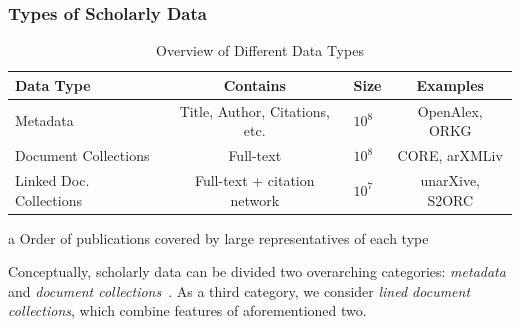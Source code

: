 \subsubsection{Types of Scholarly Data}

\begin{table}[tb]
  \caption{Overview of Different Data Types}
  \label{tab:data_types}
  \centering
  \begin{small}
    \begin{threeparttable}
      \begin{tabular}{lclc}
        \toprule
        Data Type                  & Contains                             & Size\tnote{a} & Examples \\
        \midrule
        Metadata                   & Title, Author, Citations, etc.       & \(10^8\)              & OpenAlex, ORKG \\
        Document Collections       & Full-text                            & \(10^8\)              & CORE, arXMLiv \\
        Linked Doc. Collections    & Full-text + citation network         & \(10^7\)              & unarXive, S2ORC \\
        \bottomrule
      \end{tabular}
      \begin{tablenotes}
        \item[a] Order of publications covered by large representatives of each type
      \end{tablenotes}
    \end{threeparttable}
  \end{small}
\end{table}

Conceptually, scholarly data can be divided two overarching categories: \emph{metadata} and \emph{document collections}~\cite{Nasar2018}. As a third category, we consider \emph{lined document collections}, which combine features of aforementioned two.


